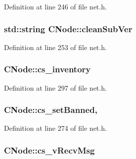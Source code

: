 Definition at line 246 of file net.\+h.

\hypertarget{class_c_node_a05f0401427c5ffebd1ca404848e83ff7}{}
\subsubsection[{clean\+Sub\+Ver}]{\setlength{\rightskip}{0pt plus 5cm}std\+::string C\+Node\+::clean\+Sub\+Ver}\label{class_c_node_a05f0401427c5ffebd1ca404848e83ff7}


Definition at line 253 of file net.\+h.

\hypertarget{class_c_node_a1e8b0784cc82f33edc2dc4e2834d1ff0}{}
\subsubsection[{cs\+\_\+inventory}]{ C\+Node\+::cs\+\_\+inventory}\label{class_c_node_a1e8b0784cc82f33edc2dc4e2834d1ff0}


Definition at line 297 of file net.\+h.

\hypertarget{class_c_node_a9ff9a6f07a280aa07d77713ae43d383a}{}
\subsubsection[{cs\+\_\+set\+Banned}]{ C\+Node\+::cs\+\_\+set\+Banned\hspace{0.3cm}{\ttfamily [static]}, {\ttfamily [protected]}}\label{class_c_node_a9ff9a6f07a280aa07d77713ae43d383a}


Definition at line 274 of file net.\+h.

\hypertarget{class_c_node_abaebfaf8fff7e2e99366ae2bc69af6cd}{}
\subsubsection[{cs\+\_\+v\+Recv\+Msg}]{ C\+Node\+::cs\+\_\+v\+Recv\+Msg}\label{class_c_node_abaebfaf8fff7e2e99366ae2bc69af6cd}


